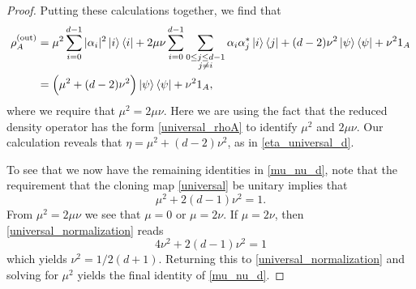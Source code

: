 \documentclass[reqno]{amsart}
\numberwithin{lemma}{section}
\numberwithin{proposition}{section}
\newcommand{\out}{\textnormal{out}}
\begin{document}
{\begin{proof}
\smallskip

Putting these calculations together, we find that
\begin{align*}
\rho_{A}^{(\out)} &= \mu^{2} \sum_{i=0}^{d-1} \vert \alpha_{i} \vert^{2} \ket{i} \bra{i} + 2\mu \nu \sum_{i=0}^{d-1} \sum_{\substack{0 \leq j \leq d-1\\ j \neq i}} \alpha_{i} \alpha_{j}^{*} \ket{i} \bra{j} + (d-2) \nu^{2} \ket{\psi} \bra{\psi} + \nu^{2} 1_{A}\\
&= \Big ( \mu^{2} + (d-2) \nu^{2} \Big ) \ket{\psi}\bra{\psi} + \nu^{2} 1_{A},
\end{align*}
where we require that $\mu^{2} = 2\mu \nu$. Here we are using the fact that the reduced density operator has the form \eqref{universal_rhoA} to identify $\mu^{2}$ and $2 \mu \nu$. Our calculation reveals that $\eta = \mu^{2} + (d-2) \nu^{2}$, as in \eqref{eta_universal_d}.

To see that we now have the remaining identities in \eqref{mu_nu_d}, note that the requirement that the cloning map \eqref{universal} be unitary implies that
\begin{equation}
\label{universal_normalization}
\mu^{2} + 2(d-1) \nu^{2} = 1.
\end{equation}
From $\mu^{2} = 2\mu \nu$ we see that $\mu = 0$ or $\mu = 2\nu$.
If $\mu = 2\nu$, then \eqref{universal_normalization} reads
\begin{equation*}
4 \nu^{2} + 2(d-1) \nu^{2} = 1
\end{equation*}
which yields $\nu^{2} = 1/2(d+1)$. Returning this to \eqref{universal_normalization} and solving for $\mu^{2}$ yields the final identity of \eqref{mu_nu_d}.

\noindent{{\color{red}{Why are we forbidden from taking $\mu = 0$?}}}

\smallskip


\end{proof}}
\end{document}
